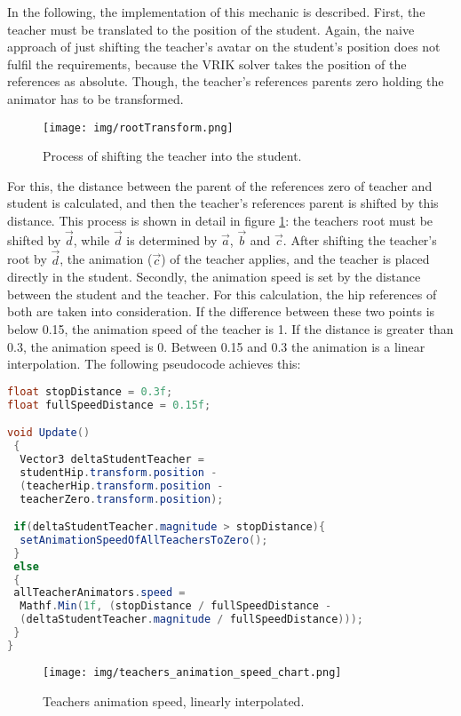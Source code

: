 In the following, the implementation of this mechanic is described. First, the teacher must be translated to the position of the student. Again, the naive approach of just shifting the teacher's avatar on the student's position does not fulfil the requirements, because the VRIK solver takes the position of the references as absolute. Though, the teacher's references parents zero holding the animator has to be transformed.
\begin{figure}
	\centering
	\texttt{[image: img/rootTransform.png]}
	\caption{Process of shifting the teacher into the student.}
	\label{fig:rootRansform}
\end{figure}

For this, the distance between the parent of the references zero of teacher and student is calculated, and then the teacher's references parent is shifted by this distance. This process is shown in detail in figure \ref{fig:rootRansform}: the teachers root must be shifted by $\vec{d}$, while $\vec{d}$ is determined by $\vec{a}$, $\vec{b}$ and $\vec{c}$. After shifting the teacher's root by $\vec{d}$, the animation ($\vec{c}$) of the teacher applies, and the teacher is placed directly in the student. Secondly, the animation speed is set by the distance between the student and the teacher. For this calculation, the hip references of both are taken into consideration. If the difference between these two points is below 0.15, the animation speed of the teacher is 1. If the distance is greater than 0.3, the animation speed is 0. Between 0.15 and 0.3 the animation is a linear interpolation. The following pseudocode achieves this:

\begin{lstlisting}[language=JAVA, frame=single]
float stopDistance = 0.3f;
float fullSpeedDistance = 0.15f;

void Update()
 {
  Vector3 deltaStudentTeacher =
  studentHip.transform.position -
  (teacherHip.transform.position -
  teacherZero.transform.position);

 if(deltaStudentTeacher.magnitude > stopDistance){
  setAnimationSpeedOfAllTeachersToZero();
 }
 else
 {
 allTeacherAnimators.speed =
  Mathf.Min(1f, (stopDistance / fullSpeedDistance - 
  (deltaStudentTeacher.magnitude / fullSpeedDistance)));
 }   
}
\end{lstlisting}

\begin{figure}
	\centering
	\texttt{[image: img/teachers\_animation\_speed\_chart.png]}
	\caption{Teachers animation speed, linearly  interpolated.}
	\label{fig:teachers_animation_speed_chart}
\end{figure}

